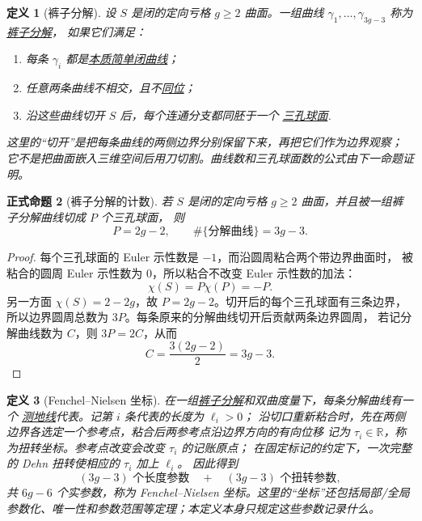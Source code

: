 \documentclass[UTF8,fontset=none,a4paper,11pt]{ctexart}
\theoremstyle{foundation-definition}
\newtheorem{definition}{定义}[section]
\theoremstyle{foundation-theorem}
\theoremstyle{foundation-proposition}
\newtheorem{proposition}[definition]{正式命题}
\theoremstyle{foundation-example}
\theoremstyle{foundation-remark}
\theoremstyle{foundation-theorem}
\newcommand{\term}[2]{\hyperref[#1]{#2}}
\begin{document}
\begin{definition}[裤子分解]\label{def:pants-decomposition}
设 \(S\) 是闭的定向亏格 \(g\geq2\) 曲面。一组曲线
\(\gamma_1,\ldots,\gamma_{3g-3}\) 称为\term{def:pants-decomposition}{裤子分解}，
如果它们满足：
\begin{enumerate}[label=(\roman*)]
  \item 每条 \(\gamma_i\) 都是\term{def:essential-simple-closed-curve}{本质简单闭曲线}；
  \item 任意两条曲线不相交，且不\term{def:curve-isotopy}{同位}；
  \item 沿这些曲线切开 \(S\) 后，每个连通分支都同胚于一个
  \term{def:pair-of-pants}{三孔球面}.
\end{enumerate}
这里的“切开”是把每条曲线的两侧边界分别保留下来，再把它们作为边界观察；
它不是把曲面嵌入三维空间后用刀切割。曲线数和三孔球面数的公式由下一命题证明。
\end{definition}

\begin{proposition}[裤子分解的计数]\label{prop:pants-count}
若 \(S\) 是闭的定向亏格 \(g\geq2\) 曲面，并且被一组裤子分解曲线切成 \(P\) 个三孔球面，
则
\[
P=2g-2,\qquad \#\{\text{分解曲线}\}=3g-3.
\]
\end{proposition}

\begin{proof}
每个三孔球面的 Euler 示性数是 \(-1\)，而沿圆周粘合两个带边界曲面时，
被粘合的圆周 Euler 示性数为 \(0\)，所以粘合不改变 Euler 示性数的加法：
\[
\chi(S)=P\chi(P)= -P.
\]
另一方面 \(\chi(S)=2-2g\)，故 \(P=2g-2\)。切开后的每个三孔球面有三条边界，
所以边界圆周总数为 \(3P\)。每条原来的分解曲线切开后贡献两条边界圆周，
若记分解曲线数为 \(C\)，则 \(3P=2C\)，从而
\[
C=\frac{3(2g-2)}2=3g-3.
\]
\end{proof}

\begin{definition}[Fenchel--Nielsen 坐标]\label{def:fenchel-nielsen}
在一组\term{def:pants-decomposition}{裤子分解}和双曲度量下，每条分解曲线有一个
\term{def:geodesic}{测地线}代表。记第 \(i\) 条代表的长度为 \(\ell_i>0\)；
沿切口重新粘合时，先在两侧边界各选定一个参考点，粘合后两参考点沿边界方向的有向位移
记为 \(\tau_i\in\mathbb R\)，称为扭转坐标。参考点改变会改变 \(\tau_i\) 的记账原点；
在固定标记的约定下，一次完整的 Dehn 扭转使相应的 \(\tau_i\) 加上 \(\ell_i\)。
因此得到
\[
(3g-3)\text{ 个长度参数}
\quad+\quad
(3g-3)\text{ 个扭转参数},
\]
共 \(6g-6\) 个实参数，称为 Fenchel--Nielsen 坐标。这里的“坐标”还包括局部/全局参数化、唯一性和参数范围等定理；本定义本身只规定这些参数记录什么。
\end{definition}
\end{document}
